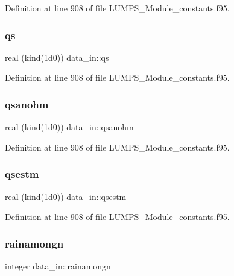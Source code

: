 Definition at line 908 of file L\+U\+M\+P\+S\+\_\+\+Module\+\_\+constants.\+f95.

\mbox{\label{namespacedata__in_aade22df4a22fe3872701ac9b6f7fed21}} 
\subsubsection{\texorpdfstring{qs}{qs}}
{\footnotesize\ttfamily real (kind(1d0)) data\+\_\+in\+::qs}



Definition at line 908 of file L\+U\+M\+P\+S\+\_\+\+Module\+\_\+constants.\+f95.

\mbox{\label{namespacedata__in_ac47d3ea5084c2019b69f3fe0b7ae4454}} 
\subsubsection{\texorpdfstring{qsanohm}{qsanohm}}
{\footnotesize\ttfamily real (kind(1d0)) data\+\_\+in\+::qsanohm}



Definition at line 908 of file L\+U\+M\+P\+S\+\_\+\+Module\+\_\+constants.\+f95.

\mbox{\label{namespacedata__in_a4c71a7e3c5a99b333e25a1876a3968b1}} 
\subsubsection{\texorpdfstring{qsestm}{qsestm}}
{\footnotesize\ttfamily real (kind(1d0)) data\+\_\+in\+::qsestm}



Definition at line 908 of file L\+U\+M\+P\+S\+\_\+\+Module\+\_\+constants.\+f95.

\mbox{\label{namespacedata__in_ac8669fa345dd942fb34ee438634579a4}} 
\subsubsection{\texorpdfstring{rainamongn}{rainamongn}}
{\footnotesize\ttfamily integer data\+\_\+in\+::rainamongn}



